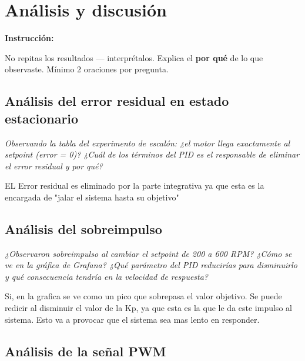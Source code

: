\documentclass[11pt, letterpaper]{article}
\newenvironment{instruccion}{%
  \begin{mdframed}[backgroundcolor=tealLight,linecolor=tealMain,linewidth=1pt,
    innerleftmargin=10pt,innerrightmargin=10pt,
    innertopmargin=6pt,innerbottommargin=6pt]
  \small\textbf{\color{tealMain}Instrucci\'on:}\hspace{4pt}
}{\end{mdframed}}
\begin{document}
\newpage

\section{Análisis y discusión}

\begin{instruccion}
  No repitas los resultados --- interpr\'etalos. Explica el
  \textbf{por qu\'e} de lo que observaste. M\'inimo 2 oraciones
  por pregunta.
\end{instruccion}

\subsection{Análisis del error residual en estado estacionario}

\textit{Observando la tabla del experimento de escal\'on:
¿el motor llega exactamente al setpoint (error = 0)?
¿Cu\'al de los t\'erminos del PID es el responsable de eliminar
el error residual y por qu\'e?}

EL Error residual es eliminado por la parte integrativa ya que esta es la encargada de "jalar el sistema hasta su objetivo"

\subsection{Análisis del sobreimpulso}

\textit{¿Observaron sobreimpulso al cambiar el setpoint de 200 a 600 RPM?
¿C\'omo se ve en la gr\'afica de Grafana? ¿Qu\'e par\'ametro del PID
reducir\'ias para disminuirlo y qu\'e consecuencia tendr\'ia en la
velocidad de respuesta?}

Si, en la grafica se ve como un pico que sobrepasa el valor objetivo. Se puede redicir al disminuir el valor de la Kp, ya que esta es la que le da este impulso al sistema. Esto va a provocar que el sistema sea mas lento en responder.

\subsection{Análisis de la señal PWM}
\end{document}

